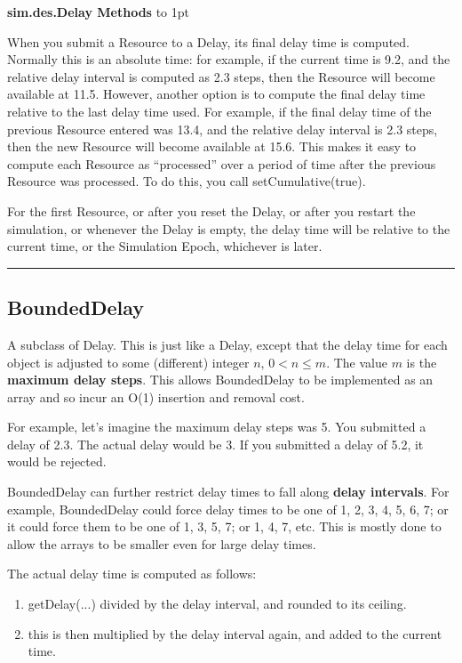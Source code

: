 \documentclass[twoside,10pt]{article}
\newcommand\class[1]{\index{Classes!{#1}}\textsf{#1}}
\newcommand\method[1]{\hbox{\textsf{#1}}}
\newcommand*{\xfill}[1][0pt]{%
	\cleaders
		\hbox to 1pt{\hss
			\raisebox{#1}{\rule{1.2pt}{0.4pt}}%
			\hss}\hfill}
\newenvironment{methods}[1]{
\vspace{1.0em}\noindent\textsf{\textbf{#1 Methods}}\quad \xfill[0.5ex]
\vspace{-0.25em}
\begin{description}
\small}
{\end{description}\hrule\vspace{1.5em}}
\begin{document}
\begin{methods}{\class{sim.des.Delay}}
When you submit a Resource to a Delay, its final delay time is computed.  Normally this is an absolute time: for example, if the current time is 9.2, and the relative delay interval is computed as 2.3 steps, then the Resource will become available at 11.5.  However, another option is to compute the final delay time relative to the last delay time used.   For example, if the final delay time of the previous Resource entered was 13.4, and the relative delay interval is 2.3 steps, then the new Resource will become available at 15.6.  This makes it easy to compute each Resource as ``processed'' over a period of time after the previous Resource was processed.  To do this, you call \method{setCumulative(true)}.  

For the first Resource, or after you reset the Delay, or after you restart
	the simulation, or whenever the Delay is empty, the delay time will be relative to the current time, or the
	Simulation Epoch, whichever is later.


\end{methods}

\subsection{BoundedDelay}

A subclass of Delay.  This is just like a Delay, except that the delay time for each object is adjusted to some (different) integer \(n\), \(0 < n \leq m\).  The value \(m\) is the {\bf maximum delay steps}.  This allows BoundedDelay to be implemented as an array and so incur an O(1) insertion and removal cost.  

For example, let's imagine the maximum delay steps was 5.  You submitted a delay of 2.3.  The actual delay would be 3.  If you submitted a delay  of 5.2, it would be rejected.

BoundedDelay can further restrict delay times to fall along {\bf delay intervals}.  For example, BoundedDelay could force delay times to be one of 1, 2, 3, 4, 5, 6, 7; or it could force them to be one of 1, 3, 5, 7; or 1, 4, 7, etc.  This is mostly done to allow the arrays to be smaller even for large delay times.  

The actual delay time is computed as follows:
\begin{enumerate}
\item getDelay(...) divided by the delay interval, and rounded to its ceiling.
\item this is then multiplied by the delay interval again, and added to the current time.
\end{enumerate}
\end{document}
